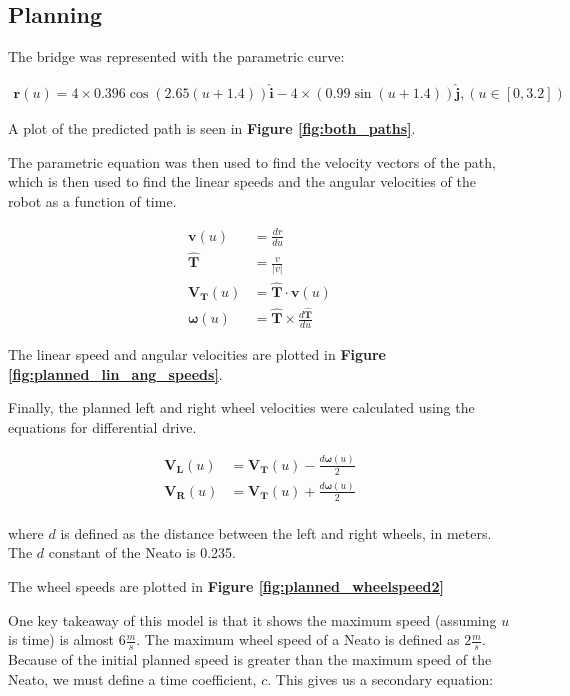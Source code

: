 \subsection{Planning}
The bridge was represented with the parametric curve:

\begin{align*}
    \boldsymbol{r}(u) = 4 \times 0.396 \cos(2.65 (u + 1.4)) \boldsymbol{\hat{i}} - 4 \times (0.99 \sin(u+1.4)) \boldsymbol{\hat{j}}, (u \in [0, 3.2])
\end{align*}

A plot of the predicted path is seen in \textbf{Figure \ref{fig:both_paths}}.

The parametric equation was then used to find the velocity vectors of the path, which is then used to find the linear speeds and the angular velocities of the robot as a function of time.

\begin{align*}
    \boldsymbol{v}(u) &= \frac{dr}{du} \\
    \boldsymbol{\hat{T}} &= \frac{v}{|v|} \\
    \boldsymbol{V_T}(u) &= \boldsymbol{\hat{T}} \cdot \boldsymbol{v}(u) \\
    \boldsymbol{\omega}(u) &= \boldsymbol{\hat{T}} \times \frac{d\boldsymbol{\hat{T}}}{du}
\end{align*}

The linear speed and angular velocities are plotted in \textbf{Figure \ref{fig:planned_lin_ang_speeds}}.

Finally, the planned left and right wheel velocities were calculated using the equations for differential drive.

\begin{align*}
    \boldsymbol{V_L}(u) &= \boldsymbol{V_T}(u) - \frac{d\boldsymbol{\omega}(u)}{2} \\
    \boldsymbol{V_R}(u) &= \boldsymbol{V_T}(u) + \frac{d\boldsymbol{\omega}(u)}{2} \\
\end{align*}

where $d$ is defined as the distance between the left and right wheels, in meters. The $d$ constant of the Neato is 0.235.

The wheel speeds are plotted in \textbf{Figure \ref{fig:planned_wheelspeed2}}

One key takeaway of this model is that it shows the maximum speed (assuming $u$ is time) is almost $6 \frac{m}{s}$. The maximum wheel speed of a Neato is defined as $2 \frac{m}{s}$. Because of the initial planned speed is greater than the maximum speed of the Neato, we must define a time coefficient, $c$. This gives us a secondary equation:

